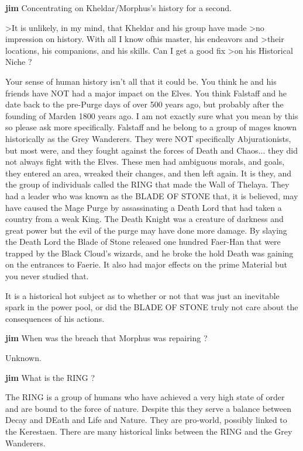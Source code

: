 {\bf jim}
 Concentrating on Kheldar/Morphus's history for a second. 

>It is unlikely, in my mind, that Kheldar and his group have made 
>no impression on history. With all I know ofhis master, his endeavors and
>their locations, his companions, and his skills. Can I get a good fix 
>on his Historical Niche ?

Your sense of human history isn't all that it could be.  You think he 
and his friends have NOT had a major impact on the Elves.  You think 
Falstaff and he date back to the pre-Purge days of  over 500 years 
ago, but probably after the founding of Marden 1800 years ago.  I am 
not exactly sure what you mean by this so please ask more 
specifically.  Falstaff and he belong to a group of mages known 
historically as the Grey Wanderers.  They were NOT specifically 
Abjurationists, but most were, and they fought against the forces of 
Death and Chaos... they did not always fight with the Elves.  These 
men had ambiguous morals, and goals, they entered an area, wreaked 
their changes, and then left again.  It is they, and the group of 
individuals  called the RING that made the Wall of Thelaya.  They had 
a leader who was known as the  BLADE OF STONE that, it is believed, 
may have caused the Mage Purge by assassinating  a Death Lord that 
had taken a country from a weak King.  The Death Knight was a  
creature of darkness and great power but the evil of the purge may 
have done more  damage.  By slaying the Death Lord the Blade of Stone 
released one hundred  Faer-Han that were trapped by the Black Cloud's 
wizards, and he broke the hold Death was gaining on the entrances to 
Faerie.  It also had major effects on the prime Material but you 
never studied that.   

It is a historical hot subject as to whether or not that was just an  
inevitable spark in the power pool, or did the BLADE OF STONE truly 
not care about the consequences of his actions.  

{\bf jim}
When was the breach that Morphus was repairing ?

Unknown.

{\bf jim}
What is the RING ? 

The RING is a group of humans who have achieved a very high state of 
order  and are bound to the force of nature.   Despite this they 
serve a balance between  Decay and DEath and Life and Nature.  They 
are pro-world, possibly linked to the  Kerestaen.  There are many 
historical links between the RING and the Grey Wanderers. 

